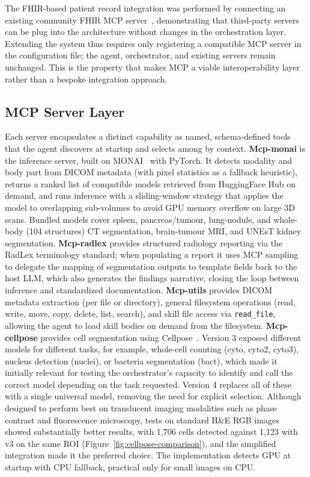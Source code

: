 \documentclass[1p,12pt]{elsarticle}
\begin{document}
The FHIR-based patient record integration was performed by connecting an existing community FHIR MCP server~\cite{ehtesham2025mcpfhir}, demonstrating that third-party servers can be plug into the architecture without changes in the orchestration layer. Extending the system thus requires only registering a compatible MCP server in the configuration file; the agent, orchestrator, and existing servers remain unchanged. This is the property that makes MCP a viable interoperability layer rather than a bespoke integration approach.

\subsection{MCP Server Layer}
Each server encapsulates a distinct capability as named, schema-defined tools that the agent discovers at startup and selects among by context. 
\textbf{Mcp-monai} is the inference server, built on MONAI~\cite{monai} with PyTorch. It detects modality and body part from DICOM metadata (with pixel statistics as a fallback heuristic), returns a ranked list of compatible models retrieved from HuggingFace Hub on demand, and runs inference with a sliding-window strategy that applies the model to overlapping sub-volumes to avoid GPU memory overflow on large 3D scans. Bundled models cover spleen, pancreas/tumour, lung-nodule, and whole-body (104 structures) CT segmentation, brain-tumour MRI, and UNEsT kidney segmentation. 
\textbf{Mcp-radlex} provides structured radiology reporting via the RadLex terminology standard; when populating a report it uses MCP sampling to delegate the mapping of segmentation outputs to template fields back to the host LLM, which also generates the findings narrative, closing the loop between inference and standardized documentation. 
\textbf{Mcp-utils} provides DICOM metadata extraction (per file or directory), general filesystem operations (read, write, move, copy, delete, list, search), and skill file access via \texttt{read\_file}, allowing the agent to load skill bodies on demand from the filesystem.
\textbf{Mcp-cellpose} provides cell segmentation using Cellpose~\cite{cellpose}. Version 3 exposed different models for different tasks, for example, whole-cell counting (cyto, cyto2, cyto3), nucleus detection (nuclei), or bacteria segmentation (bact), which made it initially relevant for testing the orchestrator's capacity to identify and call the correct model depending on the task requested. Version 4 replaces all of these with a single universal model, removing the need for explicit selection. Although designed to perform best on translucent imaging modalities such as phase contrast and fluorescence microscopy, tests on standard H\&E RGB images showed substantially better results, with 1{,}706 cells detected against 1{,}123 with v3 on the same ROI (Figure~\ref{fig:cellpose-comparison}), and the simplified integration made it the preferred choice. The implementation detects GPU at startup with CPU fallback, practical only for small images on CPU.
\end{document}
